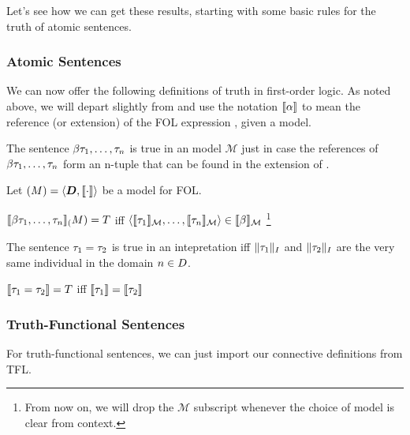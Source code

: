 Let's see how we can get these results, starting with some basic rules for the
truth of atomic sentences.

\subsubsection{Atomic Sentences}

We can now offer the following definitions of truth in first-order logic. As
noted above, we will depart slightly from \cite{Mag25} and use the notation
$\llbracket\alpha\rrbracket$ to mean the reference (or extension) of the FOL expression
\ealpha, given a model.

The sentence $\beta\tau_1,\dots,\tau_n$ is true in an model $\mathcal{M}$
just in case the references of $\beta\tau_1,\dots,\tau_n$ form an n-tuple
that can be found in the extension of \ebeta.

\begin{definition}
  \label{def:fol-atomic-truth}
  Let $\mathcal(M)=\langle\boldsymbol{D},\llbracket\cdot\rrbracket\rangle$ be a model for
  FOL.

  $\llbracket\beta\tau_1,\dots,\tau_n\rrbracket_\mathcal(M) = T$
  iff $\langle\llbracket\tau_1\rrbracket_\mathcal{M},\dots,
  \llbracket\tau_n\rrbracket_\mathcal{M}\rangle\in \llbracket\beta\rrbracket_\mathcal{M}$
  \footnote{From now on, we will drop the $\mathcal{M}$ subscript whenever the
  choice of model is clear from context.}
\end{definition}

The sentence $\tau_1=\tau_2$ is true in an intepretation iff $\|\tau_1\|_I$
and $\|\tau_2\|_I$ are the very same individual in the domain $n\in D$.

\begin{definition}
  \label{def:fol-identity-truth}
  $\llbracket\tau_1=\tau_2\rrbracket = T$ iff $\llbracket\tau_1\rrbracket=\llbracket\tau_2\rrbracket$  
\end{definition}

\subsubsection{Truth-Functional Sentences}

For truth-functional sentences, we can just import our connective definitions
from TFL.

